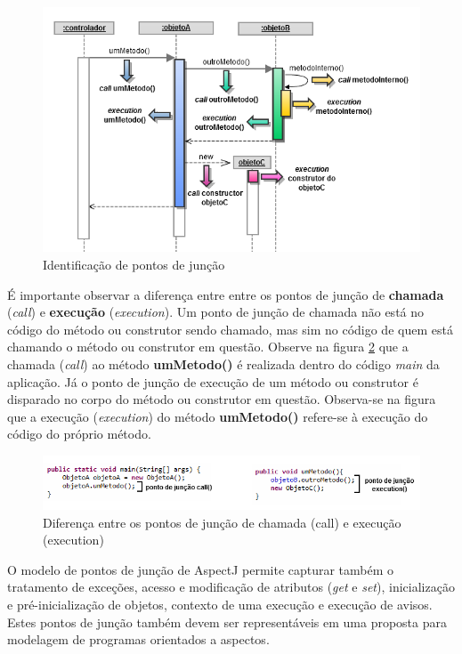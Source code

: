 \begin{figure}[!hb]
	\centering
	\includegraphics{img/aspects_join_point_model.png}
	\caption{Identificação de pontos de junção}\label{fig:aspects_join_point_model}
\end{figure}

É importante observar a diferença entre entre os pontos de junção de \textbf{chamada} (\textit{call}) e \textbf{execução} (\textit{execution}). Um
ponto de junção de chamada não está no código do método ou construtor sendo chamado, mas sim no código de quem está chamando o método ou construtor em
questão. Observe na figura \ref{fig:call_vs_execution} que a chamada (\textit{call}) ao método \textbf{umMetodo()} é realizada dentro do código
\textit{main} da aplicação. Já o ponto de junção de execução de um método ou construtor é disparado no corpo do método ou construtor em questão.
Observa-se na figura que a execução (\textit{execution}) do método \textbf{umMetodo()} refere-se à execução do código do próprio método.

\begin{figure}[!hb]
	\centering
	\includegraphics[scale=0.9]{img/call_vs_execution.png}
	\caption{Diferença entre os pontos de junção de chamada (call) e execução (execution)}\label{fig:call_vs_execution}
\end{figure}

O modelo de pontos de junção de AspectJ permite capturar também o tratamento de exceções, acesso e modificação de atributos (\textit{get} e
\textit{set}), inicialização e pré-inicialização de objetos, contexto de uma execução e execução de avisos. Estes pontos de junção também devem ser
representáveis em uma proposta para modelagem de programas orientados a aspectos.

